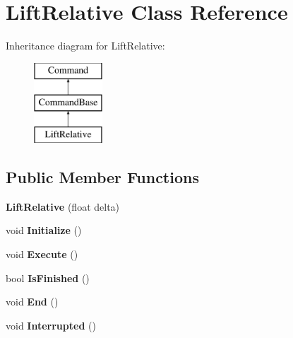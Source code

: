 \hypertarget{class_lift_relative}{}\section{Lift\+Relative Class Reference}
\label{class_lift_relative}
Inheritance diagram for Lift\+Relative\+:\begin{figure}[H]
\begin{center}
\leavevmode
\includegraphics[height=3.000000cm]{class_lift_relative}
\end{center}
\end{figure}
\subsection*{Public Member Functions}
\begin{DoxyCompactItemize}
\item 
\hypertarget{class_lift_relative_a0dd1e44d7e212315d7d305ffd1b7982d}{}{\bfseries Lift\+Relative} (float delta)\label{class_lift_relative_a0dd1e44d7e212315d7d305ffd1b7982d}

\item 
\hypertarget{class_lift_relative_a88ac8dedb8e21a26952bafc5768b6813}{}void {\bfseries Initialize} ()\label{class_lift_relative_a88ac8dedb8e21a26952bafc5768b6813}

\item 
\hypertarget{class_lift_relative_a183fef9c1240a8a78c85d0bd811d6097}{}void {\bfseries Execute} ()\label{class_lift_relative_a183fef9c1240a8a78c85d0bd811d6097}

\item 
\hypertarget{class_lift_relative_a4fdd568331786011beb7522611c3eee0}{}bool {\bfseries Is\+Finished} ()\label{class_lift_relative_a4fdd568331786011beb7522611c3eee0}

\item 
\hypertarget{class_lift_relative_afc4fc4f8e41669406bb14f5b50dda78d}{}void {\bfseries End} ()\label{class_lift_relative_afc4fc4f8e41669406bb14f5b50dda78d}

\item 
\hypertarget{class_lift_relative_a5d2935f2a564a18607d185f3c4d459d1}{}void {\bfseries Interrupted} ()\label{class_lift_relative_a5d2935f2a564a18607d185f3c4d459d1}

\end{DoxyCompactItemize}
